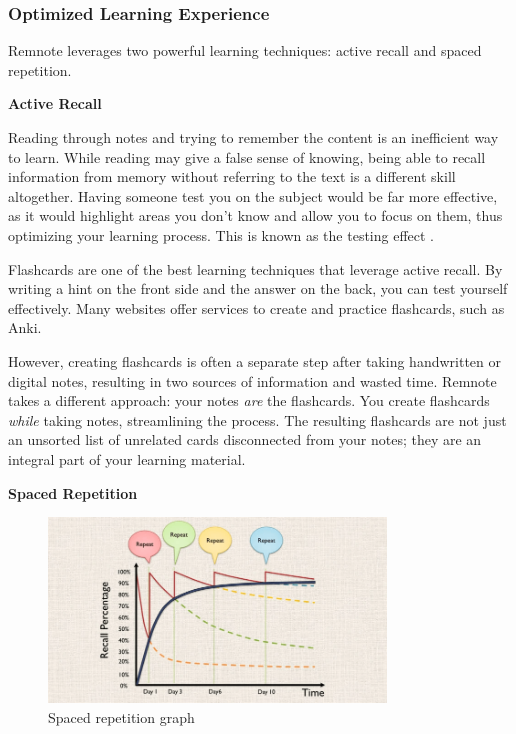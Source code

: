 \documentclass{article}
\begin{document}
\subsubsection{Optimized Learning Experience}

Remnote leverages two powerful learning techniques:
active recall and spaced repetition.

\textbf{Active Recall}

Reading through notes and trying to remember the content
is an inefficient way to learn. While reading may give a
false sense of knowing, being able to recall information
from memory without referring to the text is a different
skill altogether. Having someone test you on the subject
would be far more effective, as it would highlight areas you
don't know and allow you to focus on them, thus optimizing
your learning process. This is known as the testing effect
\cite{wikipedia_testing_effect}.

Flashcards are one of the best learning techniques that leverage
active recall. By writing a hint on the front side
and the answer on the back, you can test yourself effectively.
Many websites offer services to create and practice flashcards,
such as Anki.

However, creating flashcards is often a separate step after
taking handwritten or digital notes, resulting in two sources
of information and wasted time. Remnote takes a different approach:
your notes \textit{are} the flashcards. You create flashcards
\textit{while} taking notes, streamlining the process.
The resulting flashcards are not just an unsorted list of
unrelated cards disconnected from your notes; they are an integral
part of your learning material.

\textbf{Spaced Repetition}

\begin{figure}[h]
    \centering
    \includegraphics[width=0.8\textwidth]{images/spaced_repetition_principle.png}
    \caption{Spaced repetition graph \cite{heylama_spaced_repetition}}
\end{figure}
\end{document}
